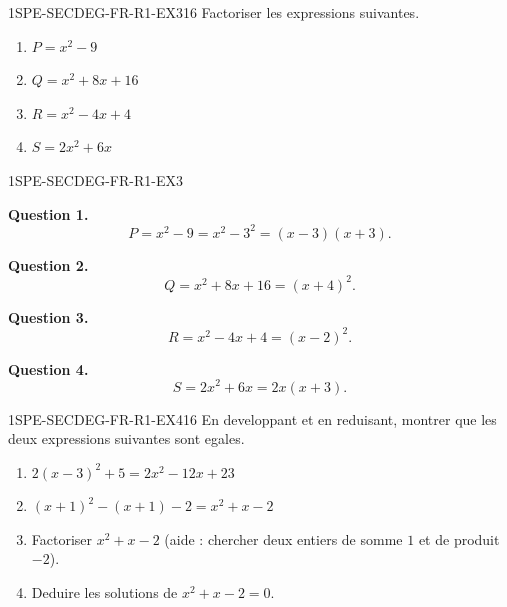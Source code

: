 
\begin{exercice}{1SPE-SECDEG-FR-R1-EX3}{1}{6}
Factoriser les expressions suivantes.
\begin{enumerate}
  \item $P = x^2 - 9$
  \item $Q = x^2 + 8x + 16$
  \item $R = x^2 - 4x + 4$
  \item $S = 2x^2 + 6x$
\end{enumerate}
\end{exercice}


\begin{corrige}{1SPE-SECDEG-FR-R1-EX3}


\textbf{Question 1.}
\[
P = x^2 - 9 = x^2 - 3^2 = (x-3)(x+3).
\]


\textbf{Question 2.}
\[
Q = x^2 + 8x + 16 = (x + 4)^2.
\]


\textbf{Question 3.}
\[
R = x^2 - 4x + 4 = (x - 2)^2.
\]


\textbf{Question 4.}
\[
S = 2x^2 + 6x = 2x(x + 3).
\]

\end{corrige}


\begin{exercice}{1SPE-SECDEG-FR-R1-EX4}{1}{6}
En developpant et en reduisant, montrer que les deux expressions suivantes sont egales.
\begin{enumerate}
  \item $2(x-3)^2 + 5 = 2x^2 - 12x + 23$
  \item $(x+1)^2 - (x+1) - 2 = x^2 + x - 2$
  \item Factoriser $x^2 + x - 2$ (aide : chercher deux entiers de somme $1$ et de produit $-2$).
  \item Deduire les solutions de $x^2 + x - 2 = 0$.
\end{enumerate}
\end{exercice}

